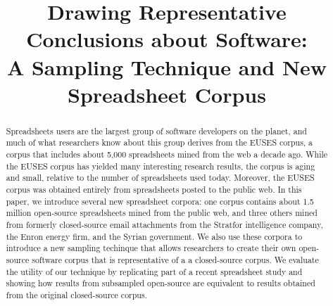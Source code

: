 \documentclass{sig-alternate} %
\begin{document}
\title{Drawing Representative Conclusions about Software:\\A Sampling Technique and New Spreadsheet Corpus}

\maketitle

\begin{abstract}
Spreadsheets users are the largest group of software developers on
the planet, and much of what researchers know about this group derives
from the EUSES corpus, a corpus that includes about 5,000 spreadsheets
mined from the web a decade ago.
While the EUSES corpus has yielded many interesting research results,
the corpus is aging and small, relative to the number of spreadsheets
used today.
Moreover, the EUSES corpus was obtained entirely from spreadsheets posted
to the public web.
In this paper, we introduce several new spreadsheet corpora: one corpus contains
about 1.5 million open-source spreadsheets mined from the public web, 
and three others mined from formerly closed-source email attachments from the Stratfor intelligence
company, the Enron energy firm, and the Syrian government.
We also use these corpora to introduce a new sampling techinque that allows researchers to 
create their own open-source software corpus that is representative of 
a a closed-source corpus.
We evaluate the utility of our technique by 
replicating part of a recent spreadsheet study and showing
how results from subsampled open-source are equivalent to 
results obtained from the original closed-source corpus.
\end{abstract}
\end{document}
